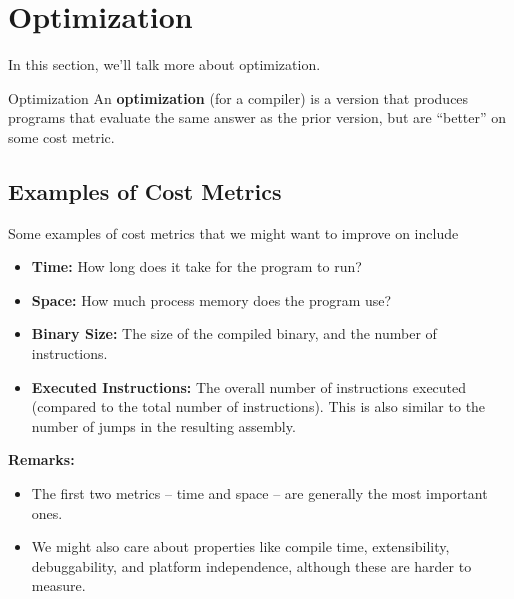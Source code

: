 \section{Optimization}
In this section, we'll talk more about optimization. 

\begin{definition}{Optimization}{}
    An \textbf{optimization} (for a compiler) is a version that produces programs that evaluate the same answer as the prior version, but are ``better'' on some cost metric.
\end{definition}

\subsection{Examples of Cost Metrics}
Some examples of cost metrics that we might want to improve on include 
\begin{itemize}
    \item \textbf{Time:} How long does it take for the program to run? 
    \item \textbf{Space:} How much process memory does the program use? 
    \item \textbf{Binary Size:} The size of the compiled binary, and the number of instructions.
    \item \textbf{Executed Instructions:} The overall number of instructions executed (compared to the total number of instructions). This is also similar to the number of jumps in the resulting assembly.  
\end{itemize}
\textbf{Remarks:}
\begin{itemize}
    \item The first two metrics -- time and space -- are generally the most important ones. 
    \item We might also care about properties like compile time, extensibility, debuggability, and platform independence, although these are harder to measure.
\end{itemize}

